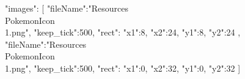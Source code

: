 {
	"images":
	[
		{
			"fileName":"Resources\\PokemonIcon\\1.png",
			"keep_tick":500,
			"rect":
			{
				"x1":8,
				"x2":24,
				"y1":8,
				"y2":24
			}
		},
		{
			"fileName":"Resources\\PokemonIcon\\1.png",
			"keep_tick":500,
			"rect":
			{
				"x1":0,
				"x2":32,
				"y1":0,
				"y2":32
			}
		}
	]
}